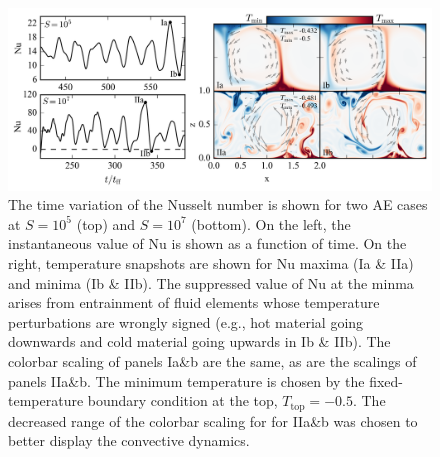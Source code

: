 \documentclass[aps, pre, onecolumn, nofootinbib, notitlepage, groupedaddress, amsfonts, amssymb, amsmath, longbibliography]{revtex4-1}
\begin{document}
\begin{figure}[t]
\includegraphics[width=\textwidth]{./figs/oscillating_plumes.png}
\caption{The time variation of the Nusselt number is shown for two AE cases at
$S = 10^5$ (top) and $S = 10^7$ (bottom). On the left, the instantaneous value of Nu
is shown as a function of time. On the right, temperature snapshots are shown for
Nu maxima (Ia \& IIa) and minima (Ib \& IIb). The suppressed value of Nu at the
minma arises from entrainment of fluid elements whose temperature perturbations
are wrongly signed (e.g., hot material going downwards and cold material going
upwards in Ib \& IIb). The colorbar scaling of panels Ia\&b are the same, as
are the scalings of panels IIa\&b. 
The minimum temperature is chosen by the fixed-temperature
boundary condition at the top, $T_{\text{top}} = -0.5$. The decreased range of
the colorbar scaling for
for IIa\&b was chosen to better display the convective dynamics.
\label{fig:oscillating_plumes} }
\end{figure}
\end{document}
